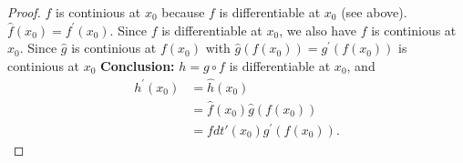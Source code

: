 \begin{proof}
		$\hat{f}$ is continious at $x_0$ because $f$ is differentiable at $x_0$ (see above). $\hat{f}\left( x_0 \right) = f^{'}\left( x_0 \right) $. Since $f$ is differentiable at $x_0$, we also have $f$ is continious at $x_0$. Since $\hat{g}$ is continious at $f\left( x_0 \right) $ with $\hat{g}\left( f\left( x_0 \right)  \right) = g^{'}\left( f\left( x_0 \right)  \right) $ is continious at $x_0$ 
		\textbf{Conclusion:}
		$h = g \circ f$ is differentiable at $x_0$,
		and 
		\begin{align*}
			h^{'}\left( x_0 \right) &= \hat{h}(x_0)\\
						&= \hat{f}\left( x_0 \right) \hat{g}\left( f\left( x_0 \right) \right)\\
						&= fdt'\left( x_0 \right) g^{'}\left( f\left( x_0 \right)  \right).
		\end{align*}	

	\end{proof}

	
